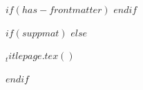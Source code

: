 $if(has-frontmatter)$
  \frontmatter
$endif$

$if(suppmat)$
$else$
\begin{titlepage}
$_titlepage.tex()$
\end{titlepage}
$endif$

\linenumbers
